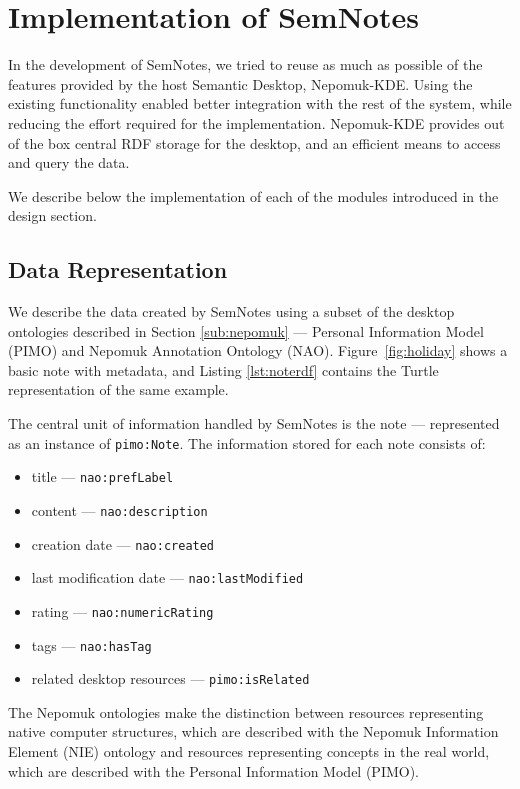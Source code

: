 \section{Implementation of SemNotes}
\label{sec:semnotesimplementation}

In the development of SemNotes, we tried to reuse as much as possible of the features provided by the host Semantic Desktop, Nepomuk-KDE\@. Using the existing functionality enabled better integration with the rest of the system, while reducing the effort required for the implementation. Nepomuk-KDE provides out of the box central RDF storage for the desktop, and an efficient means to access and query the data. 

We describe below the implementation of each of the modules introduced in the design section. 

\subsection{Data Representation} 
\label{sub:datarepresentation}

We describe the data created by SemNotes using a subset of the desktop ontologies described in Section \ref{sub:nepomuk} --- Personal Information Model (PIMO) and Nepomuk Annotation Ontology (NAO). 
Figure~\ref{fig:holiday} shows a basic note with metadata, and Listing \ref{lst:noterdf} contains the Turtle representation of the same example. 

The central unit of information handled by SemNotes is the note --- represented as an instance of \verb|pimo:Note|. 
The information stored for each note consists of: 
\begin{itemize}
 \item title --- \verb|nao:prefLabel|
 \item content --- \verb|nao:description|
 \item creation date --- \verb|nao:created|
 \item last modification date --- \verb|nao:lastModified|
 \item rating --- \verb|nao:numericRating|
 \item tags --- \verb|nao:hasTag|
 \item related desktop resources --- \verb|pimo:isRelated|
\end{itemize}

The Nepomuk ontologies make the distinction between resources representing native computer structures, which are described with the Nepomuk Information Element (NIE) ontology and resources representing concepts in the real world, which are described with the Personal Information Model (PIMO).

